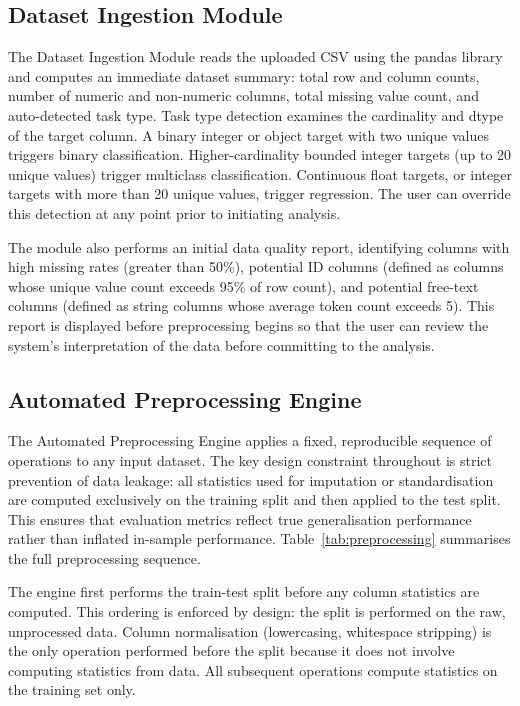 \documentclass[conference]{IEEEtran}
\begin{document}
\subsection{Dataset Ingestion Module}

The Dataset Ingestion Module reads the uploaded CSV using the pandas library and computes an immediate dataset summary: total row and column counts, number of numeric and non-numeric columns, total missing value count, and auto-detected task type. Task type detection examines the cardinality and dtype of the target column. A binary integer or object target with two unique values triggers binary classification. Higher-cardinality bounded integer targets (up to 20 unique values) trigger multiclass classification. Continuous float targets, or integer targets with more than 20 unique values, trigger regression. The user can override this detection at any point prior to initiating analysis.

The module also performs an initial data quality report, identifying columns with high missing rates (greater than 50\%), potential ID columns (defined as columns whose unique value count exceeds 95\% of row count), and potential free-text columns (defined as string columns whose average token count exceeds 5). This report is displayed before preprocessing begins so that the user can review the system's interpretation of the data before committing to the analysis.

\subsection{Automated Preprocessing Engine}

The Automated Preprocessing Engine applies a fixed, reproducible sequence of operations to any input dataset. The key design constraint throughout is strict prevention of data leakage: all statistics used for imputation or standardisation are computed exclusively on the training split and then applied to the test split. This ensures that evaluation metrics reflect true generalisation performance rather than inflated in-sample performance. Table~\ref{tab:preprocessing} summarises the full preprocessing sequence.

The engine first performs the train-test split before any column statistics are computed. This ordering is enforced by design: the split is performed on the raw, unprocessed data. Column normalisation (lowercasing, whitespace stripping) is the only operation performed before the split because it does not involve computing statistics from data. All subsequent operations compute statistics on the training set only.
\end{document}
